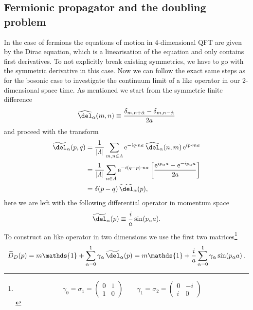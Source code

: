 \subsection{Fermionic propagator and the doubling problem}
\label{sec: ferm_doubling}
In the case of fermions the equations of motion in 4-dimensional QFT are given by the Dirac equation, which is a linearisation of the  equation and only contains first derivatives. To not explicitly break existing symmetries, we have to go with the symmetric derivative in this case. Now we can follow the exact same steps as for the bosonic case to investigate the continuum limit of a  like operator in our 2-dimensional space time. As mentioned we start from the symmetric finite difference
\begin{equation}
\widehat{\del}_{\alpha}(m,n) \equiv \dfrac{\delta_{m,n+\hat{\alpha}}-\delta_{m,n-\hat{\alpha}}}{2a}
\end{equation}
and proceed with the  transform
\begin{align}
\widetilde{\del}_{\alpha}(p,q) &= \dfrac{1}{\vert \mathit{\Lambda}\vert} \sum\limits_{m,n \in \mathit{\Lambda}} \mathrm{e}^{-i q\cdot na} \, {\widehat{\del}_\alpha}(n,m) \, \mathrm{e}^{i p\cdot ma} \\
&= \dfrac{1}{\vert \mathit{\Lambda}\vert}\sum\limits_{n \in \mathit{\Lambda}} \mathrm{e}^{- i (q-p)\cdot na} \left[ \dfrac{\mathrm{e}^{i p_{\alpha}a}-\mathrm{e}^{- i p_{\alpha}a}}{2a} \right] \\
&= \delta(p-q)\, \widetilde{\del}_{\alpha}(p),
\end{align}
here we are left with the following differential operator in momentum space
\begin{equation}
\widetilde{\del}_{\alpha}(p) \equiv \dfrac{i}{a} \sin (p_{\alpha}a).
\label{eq: naive_first_dev}
\end{equation}
To construct an   like operator in two dimensions we use the first two  matrices\footnote{\[\gamma_{0}=\sigma_{1}=\left( \begin{array}{cc}
0 & 1 \\
1 & 0
\end{array}  \right) \qquad \gamma_{1}=\sigma_{2}=\left( \begin{array}{cc}
0 & -i \\
i & 0
\end{array}  \right) \]}
%
%
\begin{equation}
\widetilde{D}_{D}(p)=  m\mathds{1} + \sum\limits_{\alpha=0}^{1} \gamma_{\alpha}\, \widetilde{\del}_{\alpha}(p)  =m\mathds{1} + \dfrac{i}{a}\sum\limits_{\alpha=0}^{1} \gamma_{\alpha} \sin (p_{\alpha}a)\,.
\end{equation}
